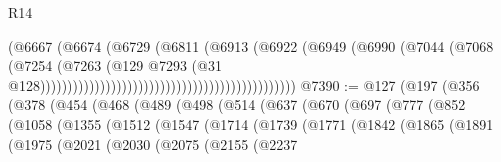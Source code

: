 \begin{lexlean}{R14}
\begin{coremodule}
                                                                      (@6667
                                                                        (@6674
                                                                          (@6729
                                                                            (@6811
                                                                              (@6913
                                                                                (@6922
                                                                                  (@6949
                                                                                    (@6990
                                                                                      (@7044
                                                                                        (@7068
                                                                                          (@7254
                                                                                            (@7263
                                                                                              (@129
                                                                                                @7293
                                                                                                (@31
                                                                                                  @128)))))))))))))))))))))))))))))))))))))))))))))))
@7390 := @127
    (@197
      (@356
        (@378
          (@454
            (@468
              (@489
                (@498
                  (@514
                    (@637
                      (@670
                        (@697
                          (@777
                            (@852
                              (@1058
                                (@1355
                                  (@1512
                                    (@1547
                                      (@1714
                                        (@1739
                                          (@1771
                                            (@1842
                                              (@1865
                                                (@1891
                                                  (@1975
                                                    (@2021
                                                      (@2030
                                                        (@2075
                                                          (@2155
                                                            (@2237

\end{coremodule}
\end{lexlean}
